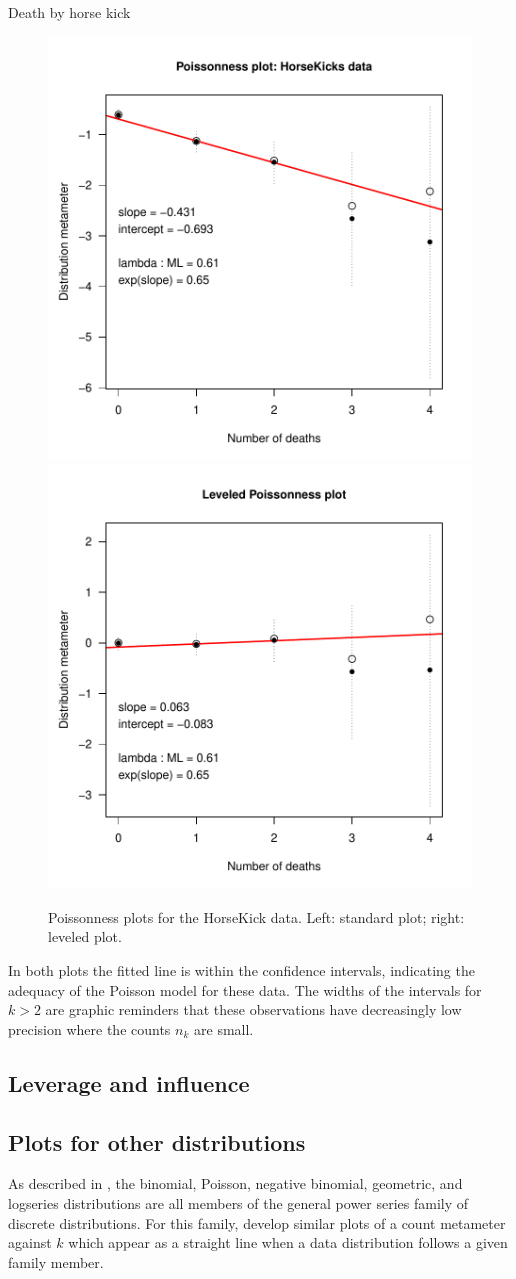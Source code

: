 \documentclass[11pt]{book}
\begin{document}
\begin{Example}[horsekick4]{Death by horse kick}
\begin{figure}[htbp]
\centerline{
\includegraphics[width=.48\textwidth]{ch03/fig/distplot1} 
\includegraphics[width=.48\textwidth]{ch03/fig/distplot2}
}
\caption[Poissonness plots for the HorseKick data]{Poissonness plots for the HorseKick data. Left: standard plot; right: leveled plot.\label{fig:distplot1}}
\end{figure}
In both plots the fitted line is within the confidence intervals,
indicating the adequacy of the Poisson model for these data.
The widths of the intervals for $k > 2$ are graphic reminders that these observations
have decreasingly low precision where the counts $n_k$ are small.

\end{Example}

\subsection{Leverage and influence}


\subsection{Plots for other distributions}\label{sec:discrete-other}
As described in , the binomial, Poisson, negative binomial,
geometric, and logseries distributions are all members of the
general  power series family of discrete distributions.
For this family, \citet{HoaglinTukey:85} develop similar plots
of a count metameter against $k$ which appear as a straight line
when a data distribution follows a given family member.
\end{document}
